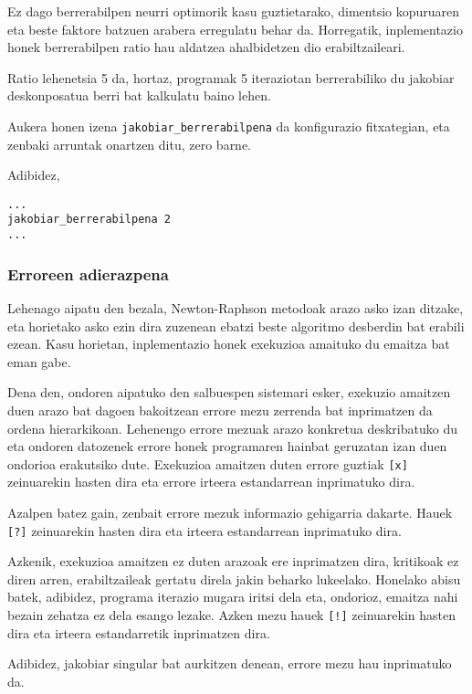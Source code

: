\documentclass[10pt,a4paper,basque]{article}
\begin{document}
Ez dago berrerabilpen neurri optimorik kasu guztietarako, dimentsio kopuruaren eta beste faktore batzuen arabera erregulatu behar da. Horregatik, inplementazio honek berrerabilpen ratio hau aldatzea ahalbidetzen dio erabiltzaileari.

Ratio lehenetsia 5 da, hortaz, programak 5 iteraziotan berrerabiliko du jakobiar deskonposatua berri bat kalkulatu baino lehen.

Aukera honen izena \verb|jakobiar_berrerabilpena| da konfigurazio fitxategian, eta zenbaki arruntak onartzen ditu, zero barne.

Adibidez,

\begin{lstlisting}
...
jakobiar_berrerabilpena 2
...
\end{lstlisting}

\subsubsection{Erroreen adierazpena}

Lehenago aipatu den bezala, Newton-Raphson metodoak arazo asko izan ditzake, eta horietako asko ezin dira zuzenean ebatzi beste algoritmo desberdin bat erabili ezean. Kasu horietan, inplementazio honek exekuzioa amaituko du emaitza bat eman gabe.

Dena den, ondoren aipatuko den salbuespen sistemari esker, exekuzio amaitzen duen arazo bat dagoen bakoitzean errore mezu zerrenda bat inprimatzen da ordena hierarkikoan. Lehenengo errore mezuak arazo konkretua deskribatuko du eta ondoren datozenek errore honek programaren hainbat geruzatan izan duen ondorioa erakutsiko dute. Exekuzioa amaitzen duten errore guztiak \verb|[x]| zeinuarekin hasten dira eta errore irteera estandarrean inprimatuko dira.

Azalpen batez gain, zenbait errore mezuk informazio gehigarria dakarte. Hauek \verb|[?]| zeinuarekin hasten dira eta irteera estandarrean inprimatuko dira.

Azkenik, exekuzioa amaitzen ez duten arazoak ere inprimatzen dira, kritikoak ez diren arren, erabiltzaileak gertatu direla jakin beharko lukeelako. Honelako abisu batek, adibidez, programa iterazio mugara iritsi dela eta, ondorioz, emaitza nahi bezain zehatza ez dela esango lezake. Azken mezu hauek \verb|[!]| zeinuarekin hasten dira eta irteera estandarretik inprimatzen dira.

Adibidez, jakobiar singular bat aurkitzen denean, errore mezu hau inprimatuko da.
\end{document}
